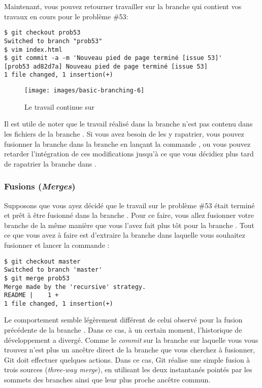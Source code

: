 Maintenant, vous pouvez retourner travailler sur la branche qui contient vos travaux en cours pour le problème \#53:
\begin{Schunk}
\begin{Verbatim}
$ git checkout prob53
Switched to branch "prob53"
$ vim index.html
$ git commit -a -m 'Nouveau pied de page terminé [issue 53]'
[prob53 ad82d7a] Nouveau pied de page terminé [issue 53]
1 file changed, 1 insertion(+)
\end{Verbatim}
\end{Schunk}

\begin{figure}[H]
  \centering
  \texttt{[image: images/basic-branching-6]}
  \caption{Le travail continue sur }
  \label{fig:git:basic-branching-6}
\end{figure}

Il est utile de noter que le travail réalisé dans la branche  n'est pas contenu dans les fichiers de la branche .
Si vous avez besoin de les y rapatrier, vous pouvez fusionner la branche  dans la branche  en lançant la commande , ou vous pouvez retarder l'intégration de ces modifications jusqu'à ce que vous décidiez plus tard de rapatrier la branche  dans .


\subsubsection{Fusions (\emph{Merges})}
\label{sec:git:basic_merging}

Supposons que vous ayez décidé que le travail sur le problème \#53 était terminé et prêt à être fusionné dans la branche .
Pour ce faire, vous allez fusionner votre branche  de la même manière que vous l'avez fait plus tôt pour la branche .
Tout ce que vous avez à faire est d'extraire la branche dans laquelle vous souhaitez fusionner et lancer la commande :
\begin{Schunk}
\begin{Verbatim}
$ git checkout master
Switched to branch 'master'
$ git merge prob53
Merge made by the 'recursive' strategy.
README |    1 +
1 file changed, 1 insertion(+)
\end{Verbatim}
\end{Schunk}

Le comportement semble légèrement différent de celui observé pour la fusion précédente de la branche .
Dans ce cas, à un certain moment, l'historique de développement a divergé.
Comme le \emph{commit} sur la branche sur laquelle vous vous trouvez n'est plus un ancêtre direct de la branche que vous cherchez à fusionner, Git doit effectuer quelques actions.
Dans ce cas, Git réalise une simple fusion à trois sources (\emph{three-way merge}), en utilisant les deux instantanés pointés par les sommets des branches ainsi que leur plus proche ancêtre commun.

